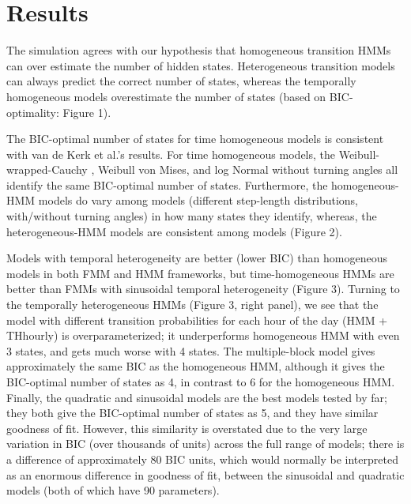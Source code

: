 \documentclass{bmcart}
\begin{document}
\section*{Results}

The simulation agrees with our hypothesis that homogeneous transition HMMs can over estimate the number of hidden states. Heterogeneous transition models can always predict the correct number of states, whereas the temporally homogeneous models overestimate the number of states (based on BIC-optimality: Figure 1). 


The BIC-optimal number of states for time homogeneous models is consistent with van de Kerk et al.'s \cite{kerk2015hidden} results. For time homogeneous models, the Weibull-wrapped-Cauchy \cite{kerk2015hidden}, Weibull von Mises, and log Normal without turning angles all identify the same BIC-optimal number of states. Furthermore, the homogeneous-HMM models do vary among models (different step-length distributions, with/without turning angles) in how many states they identify, whereas, the heterogeneous-HMM models are consistent among models (Figure 2).


Models with temporal heterogeneity are better (lower BIC) than homogeneous models in both FMM and HMM frameworks, but time-homogeneous HMMs are better than FMMs with sinusoidal temporal heterogeneity (Figure 3). Turning to the temporally heterogeneous HMMs (Figure 3, right panel), we see that the model with different transition probabilities for each hour of the day (HMM + THhourly) is overparameterized; it underperforms homogeneous HMM with even 3 states, and gets much worse with 4 states. The multiple-block model gives approximately the same BIC as the homogeneous HMM, although it gives the BIC-optimal number of states as 4, in contrast to 6 for the homogeneous HMM.  Finally, the quadratic and sinusoidal models are the best models tested by far; they both give the BIC-optimal number of states as 5, and they have similar goodness of fit.
However, this similarity is overstated due to the very large variation in BIC (over thousands of units) across the full range of models; there is a difference of approximately 80 BIC units, which would
normally be interpreted as an enormous difference in goodness of fit,
between the sinusoidal and quadratic models (both of which have 90 
parameters).
\end{document}
